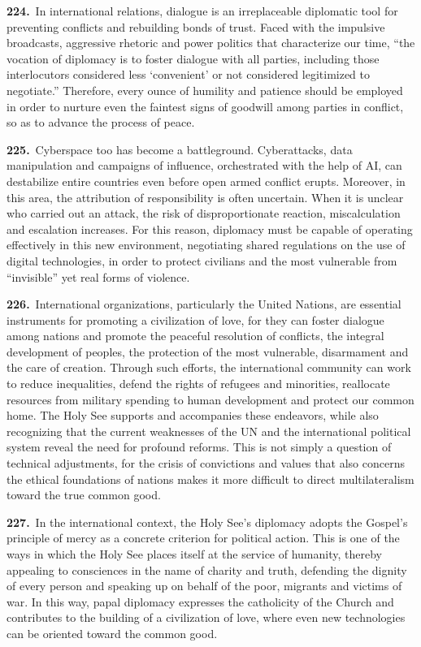 \documentclass{article}
\begin{document}
\textbf{224.}\ In international relations, dialogue is an irreplaceable diplomatic tool for preventing conflicts and rebuilding bonds of trust. Faced with the impulsive broadcasts, aggressive rhetoric and power politics that characterize our time, ``the vocation of diplomacy is to foster dialogue with all parties, including those interlocutors considered less `convenient' or not considered legitimized to negotiate.''\cite{n201} Therefore, every ounce of humility and patience should be employed in order to nurture even the faintest signs of goodwill among parties in conflict, so as to advance the process of peace.

\textbf{225.}\ Cyberspace too has become a battleground. Cyberattacks, data manipulation and campaigns of influence, orchestrated with the help of AI, can destabilize entire countries even before open armed conflict erupts. Moreover, in this area, the attribution of responsibility is often uncertain. When it is unclear who carried out an attack, the risk of disproportionate reaction, miscalculation and escalation increases. For this reason, diplomacy must be capable of operating effectively in this new environment, negotiating shared regulations on the use of digital technologies, in order to protect civilians and the most vulnerable from ``invisible'' yet real forms of violence.

\textbf{226.}\ International organizations, particularly the United Nations, are essential instruments for promoting a civilization of love, for they can foster dialogue among nations and promote the peaceful resolution of conflicts, the integral development of peoples, the protection of the most vulnerable, disarmament and the care of creation. Through such efforts, the international community can work to reduce inequalities, defend the rights of refugees and minorities, reallocate resources from military spending to human development and protect our common home. The Holy See supports and accompanies these endeavors, while also recognizing that the current weaknesses of the UN and the international political system reveal the need for profound reforms. This is not simply a question of technical adjustments, for the crisis of convictions and values that also concerns the ethical foundations of nations makes it more difficult to direct multilateralism toward the true common good.\cite{n202}

\textbf{227.}\ In the international context, the Holy See's diplomacy adopts the Gospel's principle of mercy as a concrete criterion for political action. This is one of the ways in which the Holy See places itself at the service of humanity, thereby appealing to consciences in the name of charity and truth, defending the dignity of every person and speaking up on behalf of the poor, migrants and victims of war. In this way, papal diplomacy expresses the catholicity of the Church and contributes to the building of a civilization of love, where even new technologies can be oriented toward the common good.
\end{document}
